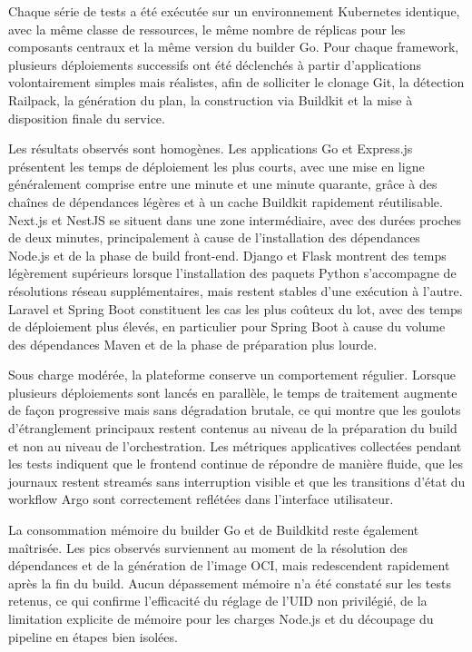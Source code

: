 Chaque série de tests a été exécutée sur un environnement Kubernetes identique, avec la même classe de ressources, le même nombre de réplicas pour les composants centraux et la même version du builder Go. Pour chaque framework, plusieurs déploiements successifs ont été déclenchés à partir d'applications volontairement simples mais réalistes, afin de solliciter le clonage Git, la détection Railpack, la génération du plan, la construction via Buildkit et la mise à disposition finale du service.

Les résultats observés sont homogènes. Les applications Go et Express.js présentent les temps de déploiement les plus courts, avec une mise en ligne généralement comprise entre une minute et une minute quarante, grâce à des chaînes de dépendances légères et à un cache Buildkit rapidement réutilisable. Next.js et NestJS se situent dans une zone intermédiaire, avec des durées proches de deux minutes, principalement à cause de l'installation des dépendances Node.js et de la phase de build front-end. Django et Flask montrent des temps légèrement supérieurs lorsque l'installation des paquets Python s'accompagne de résolutions réseau supplémentaires, mais restent stables d'une exécution à l'autre. Laravel et Spring Boot constituent les cas les plus coûteux du lot, avec des temps de déploiement plus élevés, en particulier pour Spring Boot à cause du volume des dépendances Maven et de la phase de préparation plus lourde.

Sous charge modérée, la plateforme conserve un comportement régulier. Lorsque plusieurs déploiements sont lancés en parallèle, le temps de traitement augmente de façon progressive mais sans dégradation brutale, ce qui montre que les goulots d'étranglement principaux restent contenus au niveau de la préparation du build et non au niveau de l'orchestration. Les métriques applicatives collectées pendant les tests indiquent que le frontend continue de répondre de manière fluide, que les journaux restent streamés sans interruption visible et que les transitions d'état du workflow Argo sont correctement reflétées dans l'interface utilisateur.

La consommation mémoire du builder Go et de Buildkitd reste également maîtrisée. Les pics observés surviennent au moment de la résolution des dépendances et de la génération de l'image OCI, mais redescendent rapidement après la fin du build. Aucun dépassement mémoire n'a été constaté sur les tests retenus, ce qui confirme l'efficacité du réglage de l'UID non privilégié, de la limitation explicite de mémoire pour les charges Node.js et du découpage du pipeline en étapes bien isolées.

